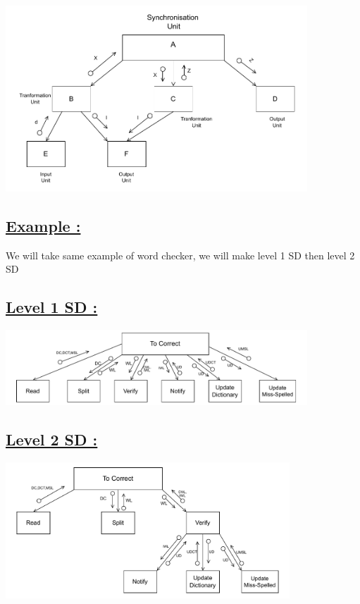 \begin{center}
\includegraphics[width=0.85\textwidth]{Chapters/Diagram/SD/sd1.drawio.pdf}
\end{center}

\vspace{0.25cm}

\subsection*{\underline{Example :}}
We will take same example of word checker, we will make level 1 SD then level 2 SD

\subsection*{\underline{Level 1 SD :}}
\begin{center}
\includegraphics[width=0.85\textwidth]{Chapters/Diagram/SD/sd2.drawio.pdf}
\end{center}



\subsection*{\underline{Level 2 SD :}}
\begin{center}
\includegraphics[width=0.8\textwidth]{Chapters/Diagram/SD/sd3.drawio.pdf}
\end{center}

